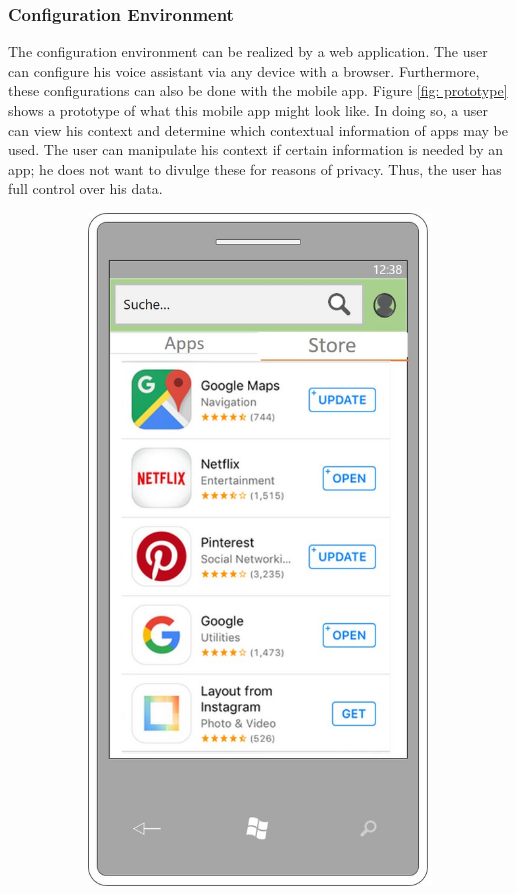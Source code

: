\subsubsection{Configuration Environment}
The configuration environment can be realized by a web application. The user can configure his voice assistant via any device with a browser. Furthermore, these configurations can also be done with the mobile app. Figure \ref{fig: prototype} shows a prototype of what this mobile app might look like. In doing so, a user can view his context and determine which contextual information of apps may be used. The user can manipulate his context if certain information is needed by an app; he does not want to divulge these for reasons of privacy. Thus, the user has full control over his data.

\begin{figure}[!ht]
	\centering
	\begin{subfigure}{0.32\linewidth}
		\centering
		\includegraphics[width=1\linewidth]{Picture/App-Store}

\end{subfigure}
\end{figure}
